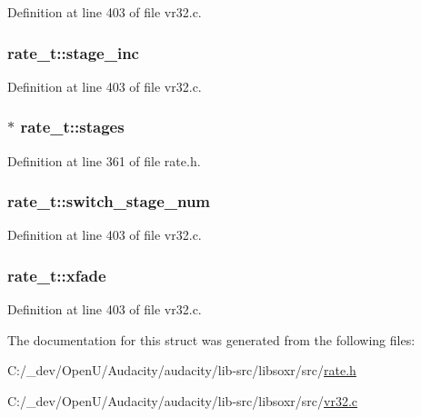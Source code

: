 Definition at line 403 of file vr32.\+c.

\subsubsection[{\texorpdfstring{stage\+\_\+inc}{stage_inc}}]{ rate\+\_\+t\+::stage\+\_\+inc}\hypertarget{structrate__t_acb8bf64869f4122a7ccdd565044aac7d}{}\label{structrate__t_acb8bf64869f4122a7ccdd565044aac7d}


Definition at line 403 of file vr32.\+c.

\subsubsection[{\texorpdfstring{stages}{stages}}]{ $\ast$ rate\+\_\+t\+::stages}\hypertarget{structrate__t_a4821b0ff0397aa4b7e0de1676f9a4928}{}\label{structrate__t_a4821b0ff0397aa4b7e0de1676f9a4928}


Definition at line 361 of file rate.\+h.

\subsubsection[{\texorpdfstring{switch\+\_\+stage\+\_\+num}{switch_stage_num}}]{ rate\+\_\+t\+::switch\+\_\+stage\+\_\+num}\hypertarget{structrate__t_a1aa5eb8fe632a379bb71293828a28291}{}\label{structrate__t_a1aa5eb8fe632a379bb71293828a28291}


Definition at line 403 of file vr32.\+c.

\subsubsection[{\texorpdfstring{xfade}{xfade}}]{ rate\+\_\+t\+::xfade}\hypertarget{structrate__t_a50cb06c68c3370792173457df6041104}{}\label{structrate__t_a50cb06c68c3370792173457df6041104}


Definition at line 403 of file vr32.\+c.



The documentation for this struct was generated from the following files\+:\begin{DoxyCompactItemize}
\item 
C\+:/\+\_\+dev/\+Open\+U/\+Audacity/audacity/lib-\/src/libsoxr/src/\hyperlink{rate_8h}{rate.\+h}\item 
C\+:/\+\_\+dev/\+Open\+U/\+Audacity/audacity/lib-\/src/libsoxr/src/\hyperlink{vr32_8c}{vr32.\+c}\end{DoxyCompactItemize}
